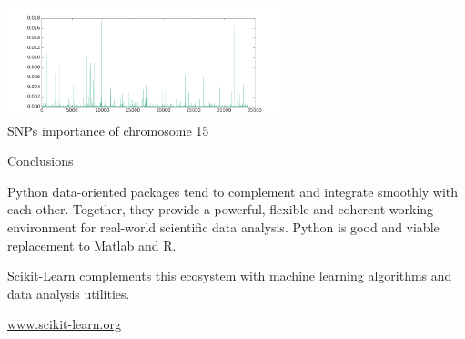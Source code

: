 \documentclass[final]{beamer}
\begin{document}
\begin{frame}[fragile]
\begin{textblock}{0.32}
\begin{block}{\vspace*{-3ex}}
\begin{center}
\includegraphics[width=0.6\textwidth]{extra_trees} \\
SNPs importance of chromosome 15
\end{center}

\end{block}

\begin{block}{Conclusions  \phantom{p}}

Python data-oriented packages tend to complement and integrate smoothly with
each other. Together, they provide a powerful, flexible and coherent working
environment for real-world scientific data analysis. Python is good and
viable replacement to Matlab and R.

\vspace{0.3cm}

Scikit-Learn complements this ecosystem with machine learning algorithms and
data analysis utilities.

\begin{center}
\begin{large}
\url{www.scikit-learn.org}
\end{large}
\end{center}
\end{block}

\end{textblock}


\end{frame}
\end{document}
